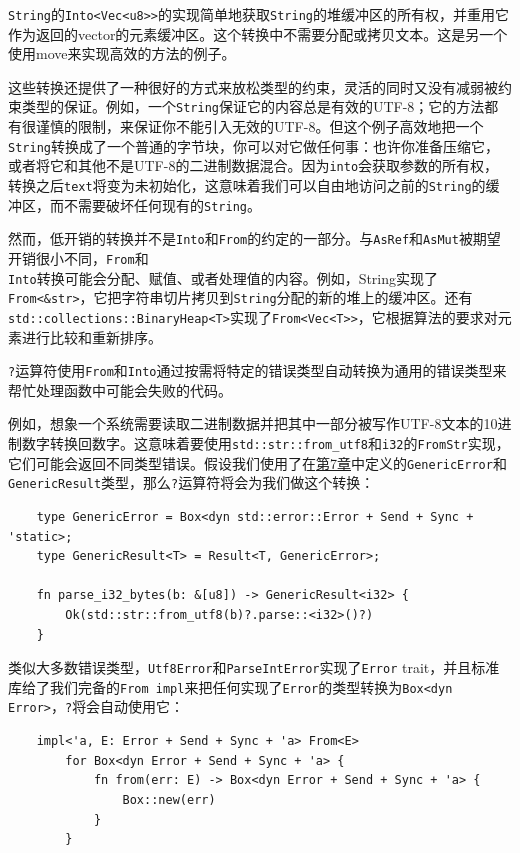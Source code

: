 \texttt{String}的\texttt{Into<Vec<u8>>}的实现简单地获取\texttt{String}的堆缓冲区的所有权，并重用它作为返回的vector的元素缓冲区。这个转换中不需要分配或拷贝文本。这是另一个使用move来实现高效的方法的例子。

这些转换还提供了一种很好的方式来放松类型的约束，灵活的同时又没有减弱被约束类型的保证。例如，一个\texttt{String}保证它的内容总是有效的UTF-8；它的方法都有很谨慎的限制，来保证你不能引入无效的UTF-8。但这个例子高效地把一个\texttt{String}转换成了一个普通的字节块，你可以对它做任何事：也许你准备压缩它，或者将它和其他不是UTF-8的二进制数据混合。因为\texttt{into}会获取参数的所有权，转换之后\texttt{text}将变为未初始化，这意味着我们可以自由地访问之前的\texttt{String}的缓冲区，而不需要破坏任何现有的\texttt{String}。

然而，低开销的转换并不是\texttt{Into}和\texttt{From}的约定的一部分。与\texttt{AsRef}和\texttt{AsMut}被期望开销很小不同，\texttt{From}和\\
\texttt{Into}转换可能会分配、赋值、或者处理值的内容。例如，String实现了\texttt{From<\&str>}，它把字符串切片拷贝到\texttt{String}分配的新的堆上的缓冲区。还有\texttt{std::collections::BinaryHeap<T>}实现了\texttt{From<Vec<T>>}，它根据算法的要求对元素进行比较和重新排序。

\texttt{?}运算符使用\texttt{From}和\texttt{Into}通过按需将特定的错误类型自动转换为通用的错误类型来帮忙处理函数中可能会失败的代码。

例如，想象一个系统需要读取二进制数据并把其中一部分被写作UTF-8文本的10进制数字转换回数字。这意味着要使用\texttt{std::str::from\_utf8}和\texttt{i32}的\texttt{FromStr}实现，它们可能会返回不同类型错误。假设我们使用了在\hyperref[ch07]{第7章}中定义的\texttt{GenericError}和\texttt{GenericResult}类型，那么\texttt{?}运算符将会为我们做这个转换：
\begin{verbatim}
    type GenericError = Box<dyn std::error::Error + Send + Sync + 'static>;
    type GenericResult<T> = Result<T, GenericError>;

    fn parse_i32_bytes(b: &[u8]) -> GenericResult<i32> {
        Ok(std::str::from_utf8(b)?.parse::<i32>()?)
    }
\end{verbatim}

类似大多数错误类型，\texttt{Utf8Error}和\texttt{ParseIntError}实现了\texttt{Error} trait，并且标准库给了我们完备的\texttt{From impl}来把任何实现了\texttt{Error}的类型转换为\texttt{Box<dyn Error>}，\texttt{?}将会自动使用它：
\begin{verbatim}
    impl<'a, E: Error + Send + Sync + 'a> From<E>
        for Box<dyn Error + Send + Sync + 'a> {
            fn from(err: E) -> Box<dyn Error + Send + Sync + 'a> {
                Box::new(err)
            }
        }
\end{verbatim}

